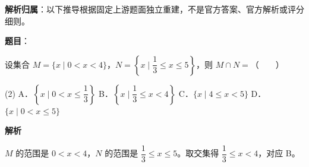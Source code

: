 

\begin{gknotice}
\textbf{解析归属}：以下推导根据固定上游题面独立重建，不是官方答案、官方解析或评分细则。
\end{gknotice}


\begin{answer}

\textbf{题目}：

设集合 $M=\{x\mid 0<x<4\}$，$N=\left\{x\mid \dfrac13\leqslant x\leqslant5\right\}$，则 $M\cap N=$\mbox{（　　）}

\begin{gkopts}(2)
\task A．$\left\{x\mid 0<x\leqslant\dfrac13\right\}$
\task B．$\left\{x\mid\dfrac13\leqslant x<4\right\}$
\task C．$\{x\mid4\leqslant x<5\}$
\task D．$\{x\mid0<x\leqslant5\}$
\end{gkopts}

\textbf{解析}

$M$ 的范围是 $0<x<4$，$N$ 的范围是 $\dfrac13\leqslant x\leqslant5$。取交集得 $\dfrac13\leqslant x<4$，对应 B。


\end{answer}
